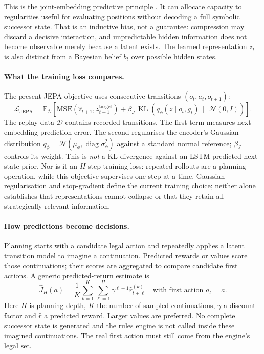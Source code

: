 \documentclass[11pt,a4paper]{article}
\theoremstyle{definition}
\theoremstyle{plain}
\DeclareMathOperator{\KL}{KL}
\begin{document}
This is the joint-embedding predictive principle \citep{lecun2022path, assran2023ijepa, maes_lelidec2026lewm}. It can allocate capacity to regularities useful for evaluating positions without decoding a full symbolic successor state. That is an inductive bias, not a guarantee: compression may discard a decisive interaction, and unpredictable hidden information does not become observable merely because a latent exists. The learned representation $z_t$ is also distinct from a Bayesian belief $b_t$ over possible hidden states.

\paragraph{What the training loss compares.} The present JEPA objective uses consecutive transitions $(o_t,a_t,o_{t+1})$:
\begin{equation}
\mathcal{L}_{\mathrm{JEPA}}
=\mathbb{E}_{\mathcal D}\!\left[
  \mathrm{MSE}\!\left(\hat z_{t+1},z^{\mathrm{target}}_{t+1}\right)
  +\beta_J\,\KL\!\left(q_\phi(z\mid o_t,g_t)\,\|\,\mathcal N(0,I)\right)
\right].
\label{eq:jepa-loss}
\end{equation}
The replay data $\mathcal D$ contains recorded transitions. The first term measures next-embedding prediction error. The second regularises the encoder's Gaussian distribution
$q_\phi=\mathcal N(\mu_\phi,\operatorname{diag}\sigma_\phi^2)$ against a standard normal reference; $\beta_J$ controls its weight. This is \emph{not} a KL divergence against an LSTM-predicted next-state prior. Nor is it an $H$-step training loss: repeated rollouts are a planning operation, while this objective supervises one step at a time. Gaussian regularisation and stop-gradient define the current training choice; neither alone establishes that representations cannot collapse or that they retain all strategically relevant information.

\paragraph{How predictions become decisions.} Planning starts with a candidate legal action and repeatedly applies a latent transition model to imagine a continuation. Predicted rewards or values score those continuations; their scores are aggregated to compare candidate first actions. A generic predicted-return estimate is
\begin{equation}
\widehat J_H(a)=\frac{1}{K}\sum_{k=1}^{K}
 \sum_{\ell=1}^{H}\gamma^{\ell-1}\hat r^{(k)}_{t+\ell}
 \quad\text{with first action }a_t=a.
\label{eq:wm-rollout}
\end{equation}
Here $H$ is planning depth, $K$ the number of sampled continuations, $\gamma$ a discount factor and $\hat r$ a predicted reward. Larger values are preferred. No complete successor state is generated and the rules engine is not called inside these imagined continuations. The real first action must still come from the engine's legal set.
\end{document}

